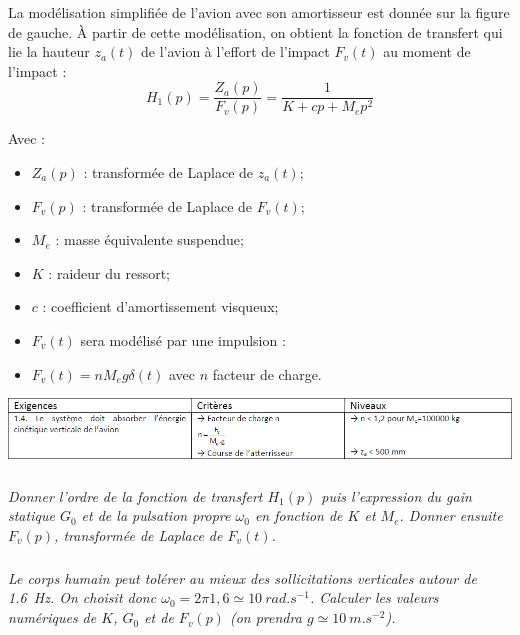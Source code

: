\documentclass[10pt,fleqn]{article} %
\begin{document}
\begin{multicols}{2}
La modélisation simplifiée de l'avion avec son
amortisseur est donnée sur la figure de gauche. À partir
de cette modélisation, on obtient la fonction de
transfert qui lie la hauteur $z_a(t)$ de l'avion à l’effort de
l’impact $F_v(t)$ au moment de l’impact :
$$
H_1(p)=\dfrac{Z_a(p)}{F_v(p)}=\dfrac{1}{K+cp+M_e p^2}
$$

Avec : 
\begin{itemize}
\item $Z_a(p)$ : transformée de Laplace de $z_a(t)$;
\item $F_v(p)$ : transformée de Laplace de $F_v(t)$;
\item $M_e$ : masse équivalente suspendue;
\item $K$ : raideur du ressort;
\item $c$ : coefficient d’amortissement visqueux;
\item $F_v(t)$ sera modélisé par une impulsion :
\item $F_v(t)=n M_e g \delta (t)$ avec $n$ facteur de charge.
\end{itemize}

\begin{center}
\includegraphics[width=\linewidth]{images/img_03}
\end{center}



\subparagraph{}
\textit{%
Donner l’ordre de la fonction
de transfert $H_1(p)$ puis l’expression du gain statique $G_0$ et de la pulsation propre $\omega_0$ en fonction de $K$ et $M_e$.
Donner ensuite $F_v(p)$, transformée de Laplace de $F_v(t)$.}
\ifprof
\begin{corrige}

\end{corrige}
\else
\fi



\subparagraph{}
\textit{Le corps humain peut tolérer au mieux des sollicitations verticales autour de \SI{1,6}{Hz}. On choisit donc $\omega_0 = 2\pi 1,6 \simeq \SI{10}{rad.s^{-1}}$. Calculer les valeurs numériques de $K$, $G_0$ et de $F_v(p)$ (on prendra $g \simeq \SI{10}{m.s^{-2}}$).}
\ifprof
\begin{corrige}
\end{corrige}
\else
\fi



\end{multicols}
\end{document}
